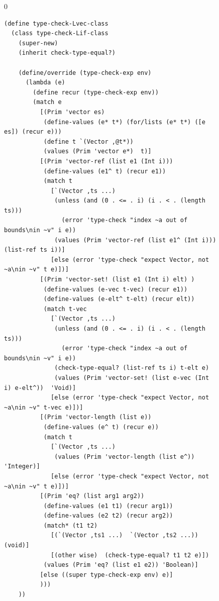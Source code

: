 \documentclass[7x10]{TimesAPriori_MIT}%
\def\racketEd{0}
\def\edition{1}
\numberwithin{theorem}{chapter}
\numberwithin{definition}{chapter}
\numberwithin{equation}{chapter}
\begin{document}
\begin{figure}[tp]
  \begin{tcolorbox}[colback=white]
    {\if\edition\racketEd
\begin{lstlisting}[basicstyle=\ttfamily\footnotesize]
(define type-check-Lvec-class
  (class type-check-Lif-class
    (super-new)
    (inherit check-type-equal?)

    (define/override (type-check-exp env)
      (lambda (e)
        (define recur (type-check-exp env))
        (match e
          [(Prim 'vector es)
           (define-values (e* t*) (for/lists (e* t*) ([e es]) (recur e)))
           (define t `(Vector ,@t*))
           (values (Prim 'vector e*)  t)]
          [(Prim 'vector-ref (list e1 (Int i)))
           (define-values (e1^ t) (recur e1))
           (match t
             [`(Vector ,ts ...)
              (unless (and (0 . <= . i) (i . < . (length ts)))
                (error 'type-check "index ~a out of bounds\nin ~v" i e))
              (values (Prim 'vector-ref (list e1^ (Int i)))  (list-ref ts i))]
             [else (error 'type-check "expect Vector, not ~a\nin ~v" t e)])]
          [(Prim 'vector-set! (list e1 (Int i) elt) )
           (define-values (e-vec t-vec) (recur e1))
           (define-values (e-elt^ t-elt) (recur elt))
           (match t-vec
             [`(Vector ,ts ...)
              (unless (and (0 . <= . i) (i . < . (length ts)))
                (error 'type-check "index ~a out of bounds\nin ~v" i e))
              (check-type-equal? (list-ref ts i) t-elt e)
              (values (Prim 'vector-set! (list e-vec (Int i) e-elt^))  'Void)]
             [else (error 'type-check "expect Vector, not ~a\nin ~v" t-vec e)])]
          [(Prim 'vector-length (list e))
           (define-values (e^ t) (recur e))
           (match t
             [`(Vector ,ts ...)
              (values (Prim 'vector-length (list e^))  'Integer)]
             [else (error 'type-check "expect Vector, not ~a\nin ~v" t e)])]
          [(Prim 'eq? (list arg1 arg2))
           (define-values (e1 t1) (recur arg1))
           (define-values (e2 t2) (recur arg2))
           (match* (t1 t2)
             [(`(Vector ,ts1 ...)  `(Vector ,ts2 ...))  (void)]
             [(other wise)  (check-type-equal? t1 t2 e)])
           (values (Prim 'eq? (list e1 e2)) 'Boolean)]
          [else ((super type-check-exp env) e)]
          )))
    ))


\end{lstlisting}}
\end{tcolorbox}
\end{figure}
\end{document}
